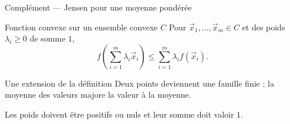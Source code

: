 \begin{frame}[t]{Complément — Jensen pour une moyenne pondérée}
\coursanalyse
\begin{theoreme}{Fonction convexe sur un ensemble convexe $C$}
Pour $\vec x_1,\ldots,\vec x_m\in C$ et des poids $\lambda_i\ge0$ de somme $1$,
\[f\!\left(\sum_{i=1}^m\lambda_i\vec x_i\right)
\le\sum_{i=1}^m\lambda_i f(\vec x_i).\]
\end{theoreme}
\begin{resultat}{Une extension de la définition}
Deux points deviennent une famille finie ; la moyenne des valeurs majore la valeur à la moyenne.
\end{resultat}
\vfill Les poids doivent être positifs ou nuls et leur somme doit valoir $1$.
\end{frame}
